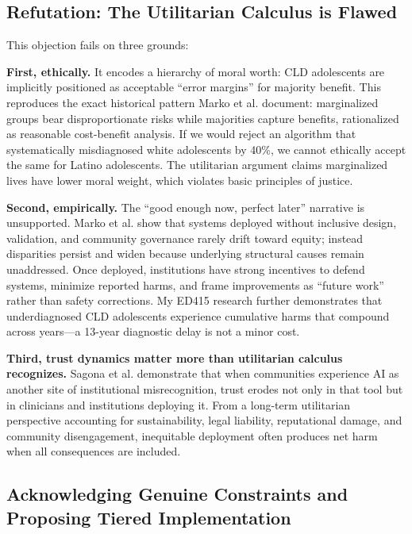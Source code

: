 \documentclass[12pt,a4paper]{article}
\begin{document}
\subsection{Refutation: The Utilitarian Calculus is Flawed}

This objection fails on three grounds:

\textbf{First, ethically.} It encodes a hierarchy of moral worth: CLD adolescents are implicitly positioned as acceptable ``error margins'' for majority benefit. This reproduces the exact historical pattern Marko et al. document: marginalized groups bear disproportionate risks while majorities capture benefits, rationalized as reasonable cost-benefit analysis.\cite{marko2025} If we would reject an algorithm that systematically misdiagnosed white adolescents by 40\%, we cannot ethically accept the same for Latino adolescents. The utilitarian argument claims marginalized lives have lower moral weight, which violates basic principles of justice.\cite{garcia_ed415}

\textbf{Second, empirically.} The ``good enough now, perfect later'' narrative is unsupported. Marko et al. show that systems deployed without inclusive design, validation, and community governance rarely drift toward equity; instead disparities persist and widen because underlying structural causes remain unaddressed.\cite{marko2025} Once deployed, institutions have strong incentives to defend systems, minimize reported harms, and frame improvements as ``future work'' rather than safety corrections. My ED415 research further demonstrates that underdiagnosed CLD adolescents experience cumulative harms that compound across years—a 13-year diagnostic delay is not a minor cost.\cite{garcia_ed415}

\textbf{Third, trust dynamics matter more than utilitarian calculus recognizes.} Sagona et al. demonstrate that when communities experience AI as another site of institutional misrecognition, trust erodes not only in that tool but in clinicians and institutions deploying it.\cite{sagona2025} From a long-term utilitarian perspective accounting for sustainability, legal liability, reputational damage, and community disengagement, inequitable deployment often produces net harm when all consequences are included.\cite{sagona2025}

\subsection{Acknowledging Genuine Constraints and Proposing Tiered Implementation}
\end{document}
